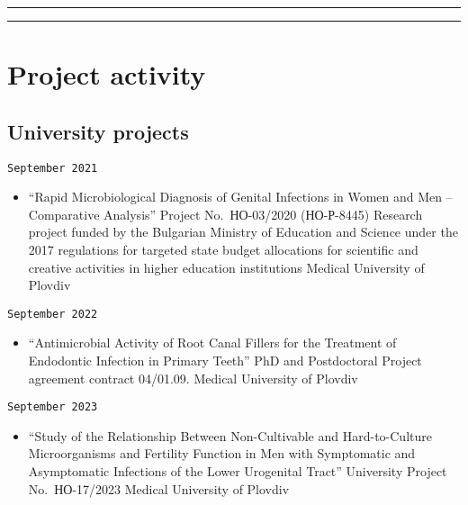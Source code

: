 \documentclass[
  12pt,
  letterpaper,
  DIV=11,
  numbers=noendperiod]{scrartcl}
\providecommand{\tightlist}{%
  \setlength{\itemsep}{0pt}\setlength{\parskip}{0pt}}\usepackage{longtable,booktabs,array}
\begin{document}
\begin{center}\rule{0.5\linewidth}{0.5pt}\end{center}

\begin{center}\rule{0.5\linewidth}{0.5pt}\end{center}

\section{Project activity}\label{project-activity}

\subsection{University projects}\label{university-projects}

\texttt{September\ 2021}

\begin{itemize}
\tightlist
\item
  ``Rapid Microbiological Diagnosis of Genital Infections in Women and
  Men -- Comparative Analysis'' \textbar{} Project No.~НО-03/2020
  (НО-Р-8445) \textbar{} Research project funded by the Bulgarian
  Ministry of Education and Science under the 2017 regulations for
  targeted state budget allocations for scientific and creative
  activities in higher education institutions \textbar{} Medical
  University of Plovdiv
\end{itemize}

\texttt{September\ 2022}

\begin{itemize}
\tightlist
\item
  ``Antimicrobial Activity of Root Canal Fillers for the Treatment of
  Endodontic Infection in Primary Teeth'' \textbar{} PhD and
  Postdoctoral Project \textbar{} agreement contract 04/01.09.
  \textbar{} Medical University of Plovdiv
\end{itemize}

\texttt{September\ 2023}

\begin{itemize}
\tightlist
\item
  ``Study of the Relationship Between Non-Cultivable and Hard-to-Culture
  Microorganisms and Fertility Function in Men with Symptomatic and
  Asymptomatic Infections of the Lower Urogenital Tract'' \textbar{}
  University Project No.~НО-17/2023 \textbar{} Medical University of
  Plovdiv
\end{itemize}
\end{document}
